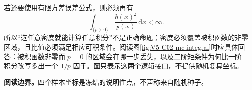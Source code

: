 \documentclass[UTF8,a4paper,11pt,openany]{ctexbook}
\begin{document}
\setcounter{page}{729}
\setcounter{chapter}{31}
\setcounter{figure}{1}
\pagestyle{headings}
若还要使用有限方差误差公式，则必须再有
\[
  \int_{\{p>0\}}\frac{h(x)^2}{p(x)}\,\mathrm dx<\infty.
\]
所以“选任意密度就能计算任意积分”不是正确命题；密度必须覆盖被积函数的非零区域，且比值必须满足相应可积条件。阅读图\ref{fig:V5-C02-mc-integral}时应具体回答：被积函数非零而 $p=0$ 的区域会在哪一步丢失，以及二阶矩条件为何比一阶积分改写多出一个 $1/p$ 因子。图只表示这两个逻辑接口，不提供随机复算坐标。

\textbf{阅读边界。}四个样本坐标是冻结的说明性点，不声称来自随机种子。
\end{document}
